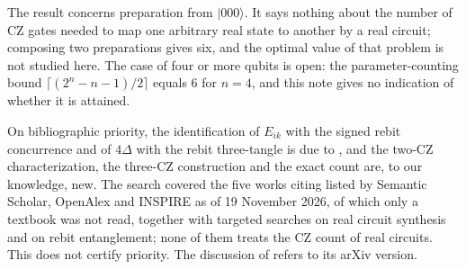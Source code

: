 \documentclass[11pt,a4paper]{article}
\theoremstyle{definition}
\theoremstyle{plain}
\newcommand{\ket}[1]{\lvert#1\rangle}
\begin{document}
The result concerns preparation from $\ket{000}$. It says nothing about the
number of CZ gates needed to map one arbitrary real state to another by a real
circuit; composing two preparations gives six, and the optimal value of that
problem is not studied here. The case of four or more qubits is open: the
parameter-counting bound $\lceil(2^n-n-1)/2\rceil$ equals $6$ for $n=4$, and
this note gives no indication of whether it is attained.

On bibliographic priority, the identification of $E_{ik}$ with the signed
rebit concurrence and of $4\Delta$ with the rebit three-tangle is due to
\cite{CavesFuchsRungta2001,Wootters2014}, and the two-CZ characterization, the
three-CZ construction and the exact count are, to our knowledge, new. The
search covered the five works citing \cite{Perdomo2022} listed by Semantic
Scholar, OpenAlex and INSPIRE as of 19 November 2026, of which only a textbook
was not read, together with targeted searches on real circuit synthesis and on
rebit entanglement; none of them treats the CZ count of real circuits. This
does not certify priority. The discussion of \cite{Perdomo2022} refers to its
arXiv version.
\end{document}
